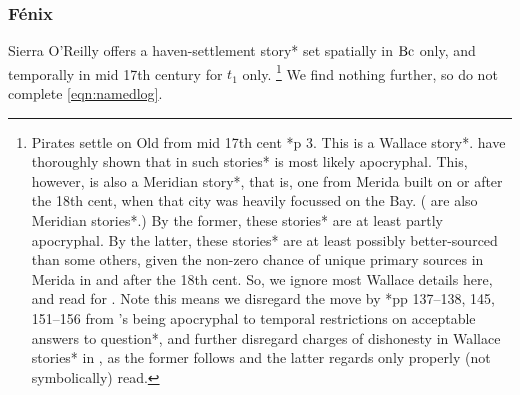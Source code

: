 		\subsubsection{Fénix}
		\label{sss:fenix}
		Sierra O'Reilly offers a haven-settlement story* set spatially in \(\operatorname{Bc}\) only, and temporally in mid 17th century for \(t_1\) only.%
		\footnote{Pirates settle on Old from mid 17th cent \cite{fen49}*{p 3}. This is a Wallace story*.  have thoroughly shown that  in such stories* is most likely apocryphal. This, however, is also a Meridian story*, that is, one from Merida built on or after the 18th cent, when that city was heavily focussed on the Bay. ( are also Meridian stories*.) By the former, these stories* are at least partly apocryphal. By the latter, these stories* are at least possibly better-sourced than some others, given the non-zero chance of unique primary sources in Merida in and after the 18th cent. So, we ignore most Wallace details here, and read  for . Note this means we disregard the move by \cite{bul16}*{pp 137--138, 145, 151--156} from 's being apocryphal to temporal restrictions on acceptable answers to question*, and further disregard charges of dishonesty in Wallace stories* in , as the former follows and the latter regards only  properly (not symbolically) read.}
		We find nothing further, so do not complete \ref{eqn:namedlog}.
